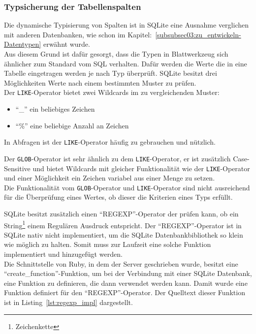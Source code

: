 \subsubsection{Typsicherung der Tabellenspalten}
\label{subsubsec04:typsicherung}
Die dynamische Typisierung von Spalten ist in SQLite eine Ausnahme verglichen mit anderen Datenbanken, wie schon im Kapitel:~\ref{subsubsec03:zu_entwickeln-Datentypen} erwähnt wurde. \\
Aus diesem Grund ist dafür gesorgt, dass die Typen in Blattwerkzeug sich ähnlicher zum Standard vom SQL verhalten. Dafür werden die Werte die in eine Tabelle eingetragen werden je nach Typ überprüft.
SQLite besitzt drei Möglichkeiten Werte nach einem bestimmten Muster zu prüfen. \\
Der \texttt{LIKE}-Operator bietet zwei Wildcards im zu vergleichenden Muster:
\begin{itemize}
    \item ``\_'' ein beliebiges Zeichen
    \item ``\%'' eine beliebige Anzahl an Zeichen
\end{itemize}
In Abfragen ist der \texttt{LIKE}-Operator häufig zu gebrauchen und nützlich.

Der \texttt{GLOB}-Operator ist sehr ähnlich zu dem \texttt{LIKE}-Operator, er ist zusätzlich Case-Sensitive und bietet Wildcards mit gleicher Funktionalität wie der \texttt{LIKE}-Operator und einer Möglichkeit ein Zeichen variabel aus einer Menge zu setzen. \\
Die Funktionalität vom \texttt{GLOB}-Operator und \texttt{LIKE}-Operator sind nicht ausreichend für die Überprüfung eines Wertes, ob dieser die Kriterien eines Typs erfüllt.

SQLite besitzt zusätzlich einen ``REGEXP''-Operator der prüfen kann, ob ein String\footnote{Zeichenkette} einem Regulären Ausdruck entspricht.
Der ``REGEXP''-Operator ist in SQLite nativ nicht implementiert, um die SQLite Datenbankbibliothek so klein wie möglich zu halten. Somit muss zur Laufzeit eine solche Funktion implementiert und hinzugefügt werden. \\
Die Schnittstelle von Ruby, in dem der Server geschrieben wurde, besitzt eine ``create\_\-function''-Funktion, um bei der Verbindung mit einer SQLite Datenbank, eine Funktion zu definieren, die dann verwendet werden kann. Damit wurde eine Funktion definiert für den ``REGEXP''-Operator. Der Quelltext dieser Funktion ist in Listing~\ref{lst:regexp_impl} dargestellt.

 

